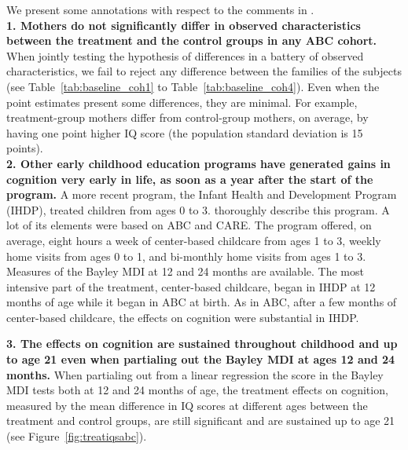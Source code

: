 \begin{appendices}
\noindent We present some annotations with respect to the comments in \citet{Spitz_1992_ABC-Retardation}.\\ 

\noindent \textbf{1. Mothers do not significantly differ in observed characteristics between the treatment and the control groups in any ABC cohort.} When jointly testing the hypothesis of differences in a battery of observed characteristics, we fail to reject any difference between the families of the subjects (see Table~\ref{tab:baseline_coh1} to Table~\ref{tab:baseline_coh4}). Even when the point estimates present some differences, they are minimal. For example, treatment-group mothers differ from control-group mothers, on average, by having one point higher IQ score (the population standard deviation is 15 points).\\

\noindent \textbf{2. Other early childhood education programs have generated gains in cognition very early in life, as soon as a year after the start of the program.} A more recent program, the Infant Health and Development Program (IHDP), treated children from ages 0 to 3. \citet{Gross_Spiker_etal_1997_BOOKHelpinglowbirth} thoroughly describe this program. A lot of its elements were based on ABC and CARE. The program offered, on average, eight hours a week of center-based childcare from ages 1 to 3, weekly home visits from ages 0 to 1, and bi-monthly home visits from ages 1 to 3. Measures of the Bayley MDI at 12 and 24 months are available. The most intensive part of the treatment, center-based childcare, began in IHDP at 12 months of age while it began in ABC at birth. As in ABC, after a few months of center-based childcare, the effects on cognition were substantial in IHDP.



\noindent \textbf{3. The effects on cognition are sustained throughout childhood and up to age 21 even when partialing out the Bayley MDI at ages 12 and 24 months.} When partialing out from a linear regression the score in the Bayley MDI tests both at 12 and 24 months of age, the treatment effects on cognition, measured by the mean difference in IQ scores at different ages between the treatment and control groups, are still significant and are sustained up to age 21 (see Figure~\ref{fig:treatiqsabc}).


\end{appendices}
